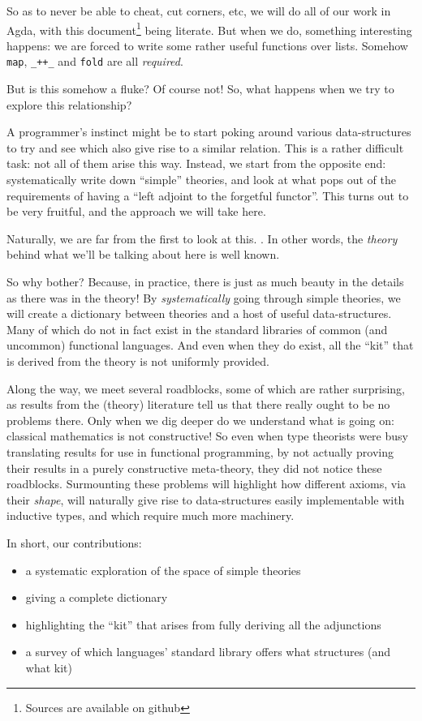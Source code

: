 \documentclass[acmsmall,review,anonymous,prologue,dvipsnames]{acmart}
\begin{document}
So as to never be able to cheat, cut corners, etc, we will do all of
our work in Agda, with this document\footnote{Sources are available on github}
being literate.  But when we do, something interesting happens: we are forced
to write some rather useful functions over lists. Somehow \texttt{map},
\texttt{\_++\_} and \texttt{fold} are all \emph{required}.

But is this somehow a fluke? Of course not! So, what happens when we
try to explore this relationship?

A programmer's instinct might be to start poking around various
data-structures to try and see which also give rise to a similar
relation. This is a rather difficult task: not all of them arise this
way. Instead, we start from the opposite end: systematically write
down ``simple'' theories, and look at what pops out of the
requirements of having a ``left adjoint to the forgetful
functor''. This turns out to be very fruitful, and the approach we
will take here.

Naturally, we are far from the first to look at this. 
. In other words, the \emph{theory}
behind what we'll be talking about here is well known.

So why bother? Because, in practice, there is just as much beauty in
the details as there was in the theory! By \emph{systematically} going
through simple theories, we will create a dictionary between theories
and a host of useful data-structures. Many of which do not in fact
exist in the standard libraries of common (and uncommon) functional
languages. And even when they do exist, all the ``kit'' that is derived
from the theory is not uniformly provided.

Along the way, we meet several roadblocks, some of which are rather
surprising, as results from the (theory) literature tell us that there
really ought to be no problems there. Only when we dig deeper do we
understand what is going on: classical mathematics is not
constructive! So even when type theorists were busy translating
results for use in functional programming, by not actually proving
their results in a purely constructive meta-theory, they did not
notice these roadblocks.
Surmounting these problems will highlight how
different axioms, via their \emph{shape}, will naturally give rise to
data-structures easily implementable with inductive types, and which
require much more machinery.

In short, our contributions:
\begin{itemize}
\item a systematic exploration of the space of simple theories
\item giving a complete dictionary
\item highlighting the ``kit'' that arises from fully deriving all the
adjunctions
\item a survey of which languages' standard library offers what structures
(and what kit)
\end{itemize}
\end{document}
